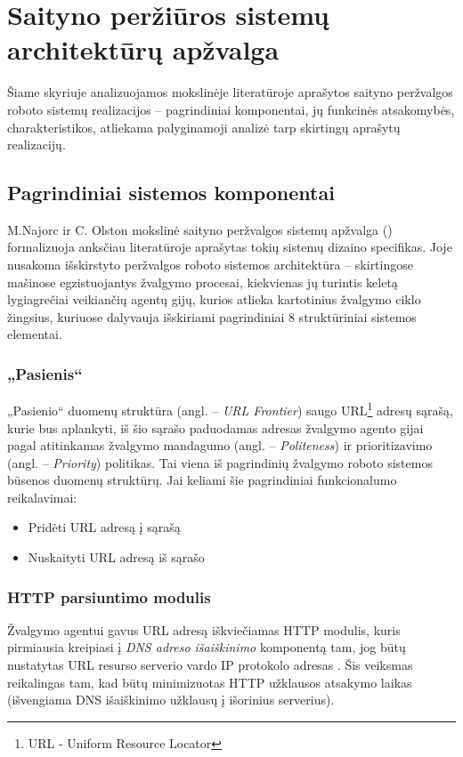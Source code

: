 \section{Saityno peržiūros sistemų architektūrų apžvalga}

Šiame skyriuje analizuojamos mokslinėje literatūroje aprašytos saityno peržvalgos roboto sistemų realizacijos -- pagrindiniai komponentai, jų funkcinės atsakomybės, charakteristikos, atliekama palyginamoji analizė tarp skirtingų aprašytų realizacijų.

\subsection{Pagrindiniai sistemos komponentai}

M.Najorc ir C. Olston mokslinė saityno peržvalgos sistemų apžvalga (\cite{StanfWebCrawl}) formalizuoja anksčiau literatūroje aprašytas tokių sistemų dizaino specifikas. Joje nusakoma išskirstyto peržvalgos roboto sistemos architektūra -- skirtingose mašinose egzistuojantys žvalgymo procesai, kiekvienas jų turintis keletą lygiagrečiai veikiančių agentų gijų, kurios atlieka kartotinius žvalgymo ciklo žingsius, kuriuose dalyvauja išskiriami pagrindiniai 8 struktūriniai sistemos elementai.

\subsubsection{„Pasienis“}

„Pasienio“ duomenų struktūra (angl. -- \textit{URL Frontier}) saugo URL\footnote{URL - Uniform Resource Locator} adresų sąrašą, kurie bus aplankyti, iš šio sąrašo paduodamas adresas žvalgymo agento gijai pagal atitinkamas žvalgymo mandagumo (angl. -- \textit{Politeness}) ir prioritizavimo (angl. -- \textit{Priority}) politikas. Tai viena iš pagrindinių žvalgymo roboto sistemos būsenos duomenų struktūrų. Jai keliami šie pagrindiniai funkcionalumo reikalavimai:
\begin{itemize}
    \item Pridėti URL adresą į sąrašą
    \item Nuskaityti URL adresą iš sąrašo
\end{itemize}

\subsubsection{HTTP parsiuntimo modulis}

Žvalgymo agentui gavus URL adresą iškviečiamas HTTP modulis, kuris pirmiausia kreipiasi į \textit{DNS adreso išaiškinimo} komponentą tam, jog būtų nustatytas URL resurso serverio vardo IP protokolo adresas \cite{StanfWebCrawl}. Šis veiksmas reikalingas tam, kad būtų minimizuotas HTTP užklausos atsakymo laikas (išvengiama DNS išaiškinimo užklausų į išorinius serverius).

